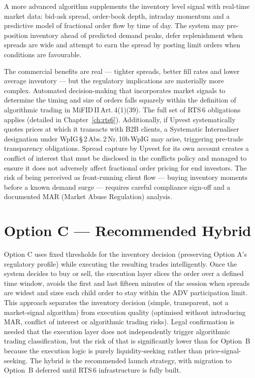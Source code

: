\documentclass[12pt,a4paper]{report}
\begin{document}
A more advanced algorithm supplements the inventory level signal with real-time market
data: bid-ask spread, order-book depth, intraday momentum and a predictive model of
fractional order flow by time of day. The system may pre-position inventory ahead of
predicted demand peaks, defer replenishment when spreads are wide and attempt to earn
the spread by posting limit orders when conditions are favourable.

The commercial benefits are real --- tighter spreads, better fill rates and lower
average inventory --- but the regulatory implications are materially more complex.
Automated decision-making that incorporates market signals to determine the timing
and size of orders falls squarely within the definition of algorithmic trading in
MiFID\,II\,Art.\,4(1)(39). The full set of RTS\,6 obligations applies (detailed in
Chapter~\ref{ch:rts6}). Additionally, if Upvest systematically quotes prices at which
it transacts with B2B clients, a Systematic Internaliser designation under
WpIG\,\S\,2\,Abs.\,2\,Nr.\,10b\,WpIG may arise, triggering pre-trade transparency
obligations. Spread capture by Upvest for its own account creates a conflict of interest
that must be disclosed in the conflicts policy and managed to ensure it does not
adversely affect fractional order pricing for end investors. The risk of being perceived
as front-running client flow --- buying inventory moments before a known demand surge
--- requires careful compliance sign-off and a documented MAR (Market Abuse Regulation)
analysis.

\section{Option C --- Recommended Hybrid}

Option C uses fixed thresholds for the inventory decision (preserving Option A's
regulatory profile) while executing the resulting trades intelligently. Once the system
decides to buy or sell, the execution layer slices the order over a defined time window,
avoids the first and last fifteen minutes of the session when spreads are widest and
sizes each child order to stay within the ADV participation limit. This approach
separates the inventory decision (simple, transparent, not a market-signal algorithm)
from execution quality (optimised without introducing MAR, conflict of interest or
algorithmic trading risks). Legal confirmation is needed that the execution layer does
not independently trigger algorithmic trading classification, but the risk of that is
significantly lower than for Option~B because the execution logic is purely
liquidity-seeking rather than price-signal-seeking. The hybrid is the recommended
launch strategy, with migration to Option~B deferred until RTS\,6 infrastructure is
fully built.
\end{document}
